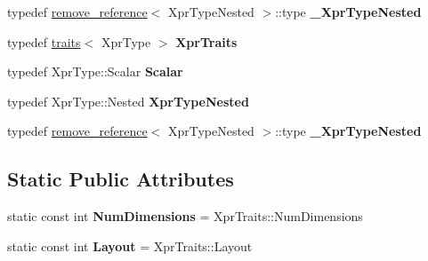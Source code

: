 \begin{DoxyCompactItemize}
typedef \hyperlink{struct_eigen_1_1internal_1_1remove__reference}{remove\+\_\+reference}$<$ Xpr\+Type\+Nested $>$\+::type {\bfseries \+\_\+\+Xpr\+Type\+Nested}
\item 
\mbox{\label{struct_eigen_1_1internal_1_1traits_3_01_tensor_cwise_nullary_op_3_01_nullary_op_00_01_xpr_type_01_4_01_4_ae4ef2d28b006d50fd199a2376d1826f4}} 
typedef \hyperlink{struct_eigen_1_1internal_1_1traits}{traits}$<$ Xpr\+Type $>$ {\bfseries Xpr\+Traits}
\item 
\mbox{\label{struct_eigen_1_1internal_1_1traits_3_01_tensor_cwise_nullary_op_3_01_nullary_op_00_01_xpr_type_01_4_01_4_a6c095bf88419b5205f8d2e657b10f0cf}} 
typedef Xpr\+Type\+::\+Scalar {\bfseries Scalar}
\item 
\mbox{\label{struct_eigen_1_1internal_1_1traits_3_01_tensor_cwise_nullary_op_3_01_nullary_op_00_01_xpr_type_01_4_01_4_a3d927edad5fd802aac140468f6f52b82}} 
typedef Xpr\+Type\+::\+Nested {\bfseries Xpr\+Type\+Nested}
\item 
\mbox{\label{struct_eigen_1_1internal_1_1traits_3_01_tensor_cwise_nullary_op_3_01_nullary_op_00_01_xpr_type_01_4_01_4_a533c9960541d3c9f19f0863c49ecfb6a}} 
typedef \hyperlink{struct_eigen_1_1internal_1_1remove__reference}{remove\+\_\+reference}$<$ Xpr\+Type\+Nested $>$\+::type {\bfseries \+\_\+\+Xpr\+Type\+Nested}
\end{DoxyCompactItemize}
\subsection*{Static Public Attributes}
\begin{DoxyCompactItemize}
\item 
\mbox{\label{struct_eigen_1_1internal_1_1traits_3_01_tensor_cwise_nullary_op_3_01_nullary_op_00_01_xpr_type_01_4_01_4_abea9630ddd7abc6b2a82ca9a18622b76}} 
static const int {\bfseries Num\+Dimensions} = Xpr\+Traits\+::\+Num\+Dimensions
\item 
\mbox{\label{struct_eigen_1_1internal_1_1traits_3_01_tensor_cwise_nullary_op_3_01_nullary_op_00_01_xpr_type_01_4_01_4_ab5ed794f3683ad19e2d9a428241b15e1}} 
static const int {\bfseries Layout} = Xpr\+Traits\+::\+Layout
\end{DoxyCompactItemize}


